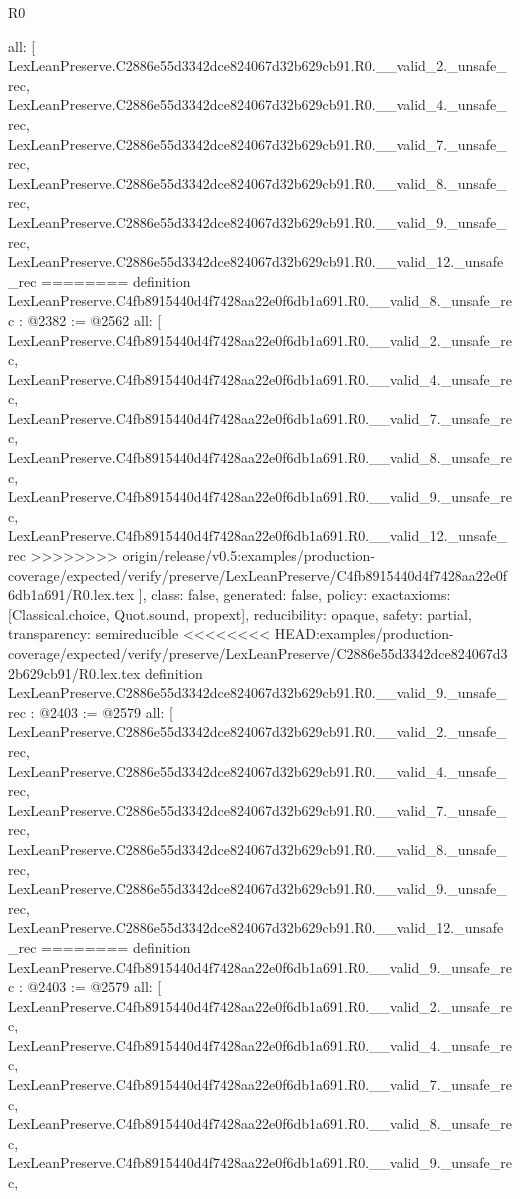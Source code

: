 \begin{lexlean}{R0}
\begin{coremodule}
{{{{{{{{{{{{{{{{{{{{{{{{{{{{{{{{{{{{{{{{{{{{{{{{{{{{{  all: [
    LexLeanPreserve.C2886e55d3342dce824067d32b629cb91.R0.__valid_2._unsafe_rec,
    LexLeanPreserve.C2886e55d3342dce824067d32b629cb91.R0.__valid_4._unsafe_rec,
    LexLeanPreserve.C2886e55d3342dce824067d32b629cb91.R0.__valid_7._unsafe_rec,
    LexLeanPreserve.C2886e55d3342dce824067d32b629cb91.R0.__valid_8._unsafe_rec,
    LexLeanPreserve.C2886e55d3342dce824067d32b629cb91.R0.__valid_9._unsafe_rec,
    LexLeanPreserve.C2886e55d3342dce824067d32b629cb91.R0.__valid_12._unsafe_rec
========
definition LexLeanPreserve.C4fb8915440d4f7428aa22e0f6db1a691.R0.__valid_8._unsafe_rec : @2382 := @2562 {
  all: [
    LexLeanPreserve.C4fb8915440d4f7428aa22e0f6db1a691.R0.__valid_2._unsafe_rec,
    LexLeanPreserve.C4fb8915440d4f7428aa22e0f6db1a691.R0.__valid_4._unsafe_rec,
    LexLeanPreserve.C4fb8915440d4f7428aa22e0f6db1a691.R0.__valid_7._unsafe_rec,
    LexLeanPreserve.C4fb8915440d4f7428aa22e0f6db1a691.R0.__valid_8._unsafe_rec,
    LexLeanPreserve.C4fb8915440d4f7428aa22e0f6db1a691.R0.__valid_9._unsafe_rec,
    LexLeanPreserve.C4fb8915440d4f7428aa22e0f6db1a691.R0.__valid_12._unsafe_rec
>>>>>>>> origin/release/v0.5:examples/production-coverage/expected/verify/preserve/LexLeanPreserve/C4fb8915440d4f7428aa22e0f6db1a691/R0.lex.tex
  ],
  class: false,
  generated: false,
  policy: exact{axioms: [Classical.choice, Quot.sound, propext]},
  reducibility: opaque{},
  safety: partial,
  transparency: semireducible
}
<<<<<<<< HEAD:examples/production-coverage/expected/verify/preserve/LexLeanPreserve/C2886e55d3342dce824067d32b629cb91/R0.lex.tex
definition LexLeanPreserve.C2886e55d3342dce824067d32b629cb91.R0.__valid_9._unsafe_rec : @2403 := @2579 {
  all: [
    LexLeanPreserve.C2886e55d3342dce824067d32b629cb91.R0.__valid_2._unsafe_rec,
    LexLeanPreserve.C2886e55d3342dce824067d32b629cb91.R0.__valid_4._unsafe_rec,
    LexLeanPreserve.C2886e55d3342dce824067d32b629cb91.R0.__valid_7._unsafe_rec,
    LexLeanPreserve.C2886e55d3342dce824067d32b629cb91.R0.__valid_8._unsafe_rec,
    LexLeanPreserve.C2886e55d3342dce824067d32b629cb91.R0.__valid_9._unsafe_rec,
    LexLeanPreserve.C2886e55d3342dce824067d32b629cb91.R0.__valid_12._unsafe_rec
========
definition LexLeanPreserve.C4fb8915440d4f7428aa22e0f6db1a691.R0.__valid_9._unsafe_rec : @2403 := @2579 {
  all: [
    LexLeanPreserve.C4fb8915440d4f7428aa22e0f6db1a691.R0.__valid_2._unsafe_rec,
    LexLeanPreserve.C4fb8915440d4f7428aa22e0f6db1a691.R0.__valid_4._unsafe_rec,
    LexLeanPreserve.C4fb8915440d4f7428aa22e0f6db1a691.R0.__valid_7._unsafe_rec,
    LexLeanPreserve.C4fb8915440d4f7428aa22e0f6db1a691.R0.__valid_8._unsafe_rec,
    LexLeanPreserve.C4fb8915440d4f7428aa22e0f6db1a691.R0.__valid_9._unsafe_rec,
}}}}}}}}}}}}}}}}}}}}}}}}}}}}}}}}}}}}}}}}}}}}}}}}}}}}}}}
\end{coremodule}
\end{lexlean}
